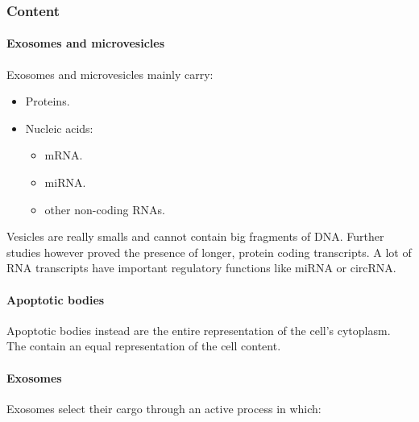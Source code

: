         \subsubsection{Content}

            \paragraph{Exosomes and microvesicles}
            Exosomes and microvesicles mainly carry:

            \begin{multicols}{2}
                \begin{itemize}
                    \item Proteins.
                    \item Nucleic acids:

                        \begin{itemize}
                            \item mRNA.
                            \item miRNA.
                            \item other non-coding RNAs.
                        \end{itemize}
                \end{itemize}
            \end{multicols}

            Vesicles are really smalls and cannot contain big fragments of DNA.
            Further studies however proved the presence of longer, protein coding transcripts.
            A lot of RNA transcripts have important regulatory functions like miRNA or circRNA.

            \paragraph{Apoptotic bodies}
            Apoptotic bodies instead are the entire representation of the cell's cytoplasm.
            The contain an equal representation of the cell content.

            \paragraph{Exosomes}
            Exosomes select their cargo through an active process in which:

